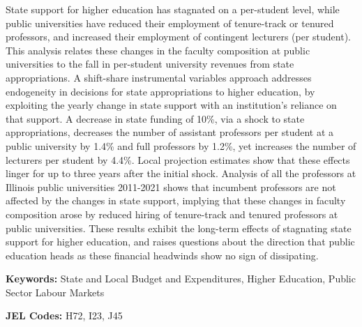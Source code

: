 \noindent
State support for higher education has stagnated on a per-student level, while public universities have reduced their employment of tenure-track or tenured professors, and increased their employment of contingent lecturers (per student).
This analysis relates these changes in the faculty composition at public universities to the fall in per-student university revenues from state appropriations.
A shift-share instrumental variables approach addresses endogeneity in decisions for state appropriations to higher education, by exploiting the yearly change in state support with an institution's reliance on that support.
A decrease in state funding of 10\%, via a shock to state appropriations, decreases the number of assistant professors per student at a public university by 1.4\% and full professors by 1.2\%, yet increases the number of lecturers per student by 4.4\%.
Local projection estimates show that these effects linger for up to three years after the initial shock.
Analysis of all the professors at Illinois public universities 2011-2021 shows that incumbent professors are not affected by the changes in state support, implying that these changes in faculty composition arose by reduced hiring of tenure-track and tenured professors at public universities.
These results exhibit the long-term effects of stagnating state support for higher education, and raises questions about the direction that public education heads as these financial headwinds show no sign of dissipating.

\vspace{0.5cm}
\noindent\textbf{Keywords:}
State and Local Budget and Expenditures,
Higher Education,
Public Sector Labour Markets

\vspace{0.25cm}
\noindent\textbf{JEL Codes:} H72, I23, J45

